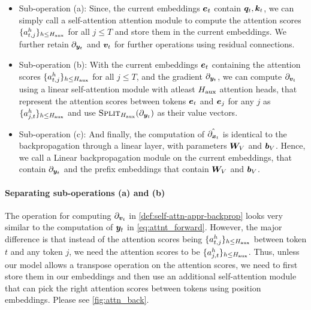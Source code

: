 \begin{itemize}
    \item Sub-operation (a): Since, the current embeddings $\ve_t$ contain ${\bm{q}}_t, {\bm{k}}_t$, we can simply call a self-attention attention module to compute the attention scores   $\{ a_{t, j}^h  \}_{h \le H_{\text{aux}}}$ for all $j\le T$ and store them in the current embeddings. We further retain $\partial_{{\bm{y}}_t}$ and ${\bm{v}}_t$ for further operations using residual connections.

    \item Sub-operation (b): With the current embeddings $\ve_t$ containing the attention scores   $\{ a_{t, j}^h  \}_{h \le H_{\text{aux}}}$ for all $j\le T$, and the gradient $\partial_{{\bm{y}}_t}$, we can compute $\partial_{{\bm{v}}_t}$ using a \simulator{} linear
 self-attention module with atleast $H_{\text{aux}}$ attention heads, that  represent the attention scores between tokens $\ve_t$ and $\ve_j$ for any $j$ as $\{ a_{j, t}^h \}_{h \le H_{\text{aux}} }$ and use $\textsc{Split}_{ H_{\text{aux}} } ( \partial_{{\bm{y}}_t} )$ as their value vectors. 

    \item Sub-operation (c): And finally, the computation of $\Hat{\partial_{{\bm{x}}_t}}$ is identical to the  backpropagation through a linear layer, with parameters ${\bm{W}}_V$ and ${\bm{b}}_V$. Hence, we call a Linear backpropagation module on the current embeddings, that contain $\partial_{{\bm{y}}_t}$ and the prefix embeddings that contain ${\bm{W}}_V$ and ${\bm{b}}_V$.
\end{itemize}

\paragraph{Separating sub-operations (a) and (b)} The operation for computing $\partial_{{\bm{v}}_t}$ in \cref{def:self-attn-appr-backprop} looks very similar to the computation of ${\bm{y}}_t$ in \cref{eq:attnt_forward}. However, the major difference is that instead of the attention scores being $\{ a_{t, j}^h \}_{h \le H_{\text{aux}} }$ between token $t$ and any token $j$, we need the attention scores to be $\{ a_{j, t}^h \}_{h \le H_{\text{aux}} }$. Thus, unless our model allows a transpose operation on the attention scores, we need to first store them in our embeddings and then use an additional self-attention module that can pick the right attention scores between tokens using position embeddings. Please see \cref{fig:attn_back}.




